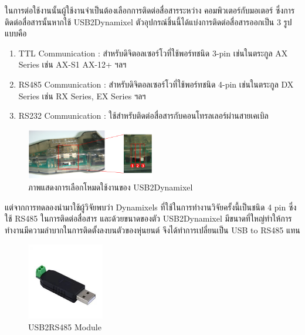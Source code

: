 ในการต่อใช้งานนั้นผู้ใช้งานจำเป็นต้องเลือกการติดต่อสื่อสารระหว่าง คอมพิวเตอร์กับมอเตอร์
ซึ่งการติดต่อสื่อสารนั้นหากใช้ USB2Dynamixel ตัวอุปกรณ์ชิ้นนี้ได้แบ่งการติดต่อสื่อสารออกเป็น 3 รูปแบบคือ
\vspace{-10pt}
\begin{enumerate}[label=\arabic*, leftmargin=1.5cm]
    \setlength\itemsep{-0.25em}
    \item TTL Communication : สำหรับดิจิตอลเซอร์โวที่ใช้พอร์ทชนิด 3-pin เช่นในตระกูล AX Series เช่น AX-S1 AX-12+ ฯลฯ
    \item RS485 Communication : สำหรับดิจิตอลเซอร์โวที่ใช้พอร์ทชนิด 4-pin เช่นในตระกูล DX Series เช่น RX Series, EX Series ฯลฯ
    \item RS232 Communication : ใช้สำหรับติดต่อสื่อสารกับคอนโทรลเลอร์ผ่านสายเคเบิล
\end{enumerate}
\vspace{-15pt}
\begin{figure}[!ht]
    \centering
    \includegraphics[width=0.5\textwidth]{chapter3/images/useusb2dynamixel.png}
    \caption{ภาพแสดงการเลือกโหมดใช้งานของ USB2Dynamixel}
    \label{fig:useusb2dynamixel}
\end{figure}

แต่จากการทดลองนำมาใช้ผู้วิจัยพบว่า Dynamixels ที่ใช้ในการทำงานวิจัยครั้งนี้เป็นชนิด 4 pin ซึ่งใช้ RS485 ในการติดต่อสื่อสาร
และด้วยขนาดของตัว USB2Dynamixel มีขนาดที่ใหญ่ทำให้การทำงานมีความลำบากในการติดตั้งลงบนตัวของหุ่นยนต์
จึงได้ทำการเปลี่ยนเป็น USB to RS485 แทน
\begin{figure}[!ht]
    \centering
    \includegraphics[width=0.3\textwidth]{chapter3/images/usb2rs485.jpg}
    \caption{USB2RS485 Module}
    \label{fig:usb2rs485}
\end{figure}

\clearpage
